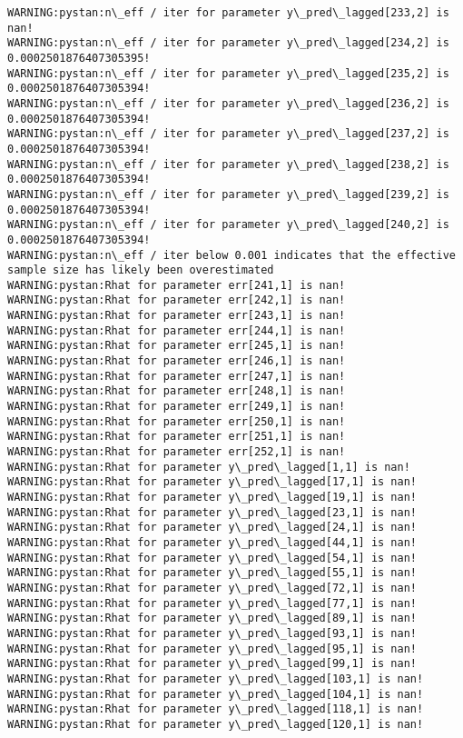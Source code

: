 \documentclass[11pt]{article}
\begin{document}
\begin{Verbatim}[commandchars=\\\{\}]
WARNING:pystan:n\_eff / iter for parameter y\_pred\_lagged[233,2] is nan!
WARNING:pystan:n\_eff / iter for parameter y\_pred\_lagged[234,2] is 0.0002501876407305395!
WARNING:pystan:n\_eff / iter for parameter y\_pred\_lagged[235,2] is 0.0002501876407305394!
WARNING:pystan:n\_eff / iter for parameter y\_pred\_lagged[236,2] is 0.0002501876407305394!
WARNING:pystan:n\_eff / iter for parameter y\_pred\_lagged[237,2] is 0.0002501876407305394!
WARNING:pystan:n\_eff / iter for parameter y\_pred\_lagged[238,2] is 0.0002501876407305394!
WARNING:pystan:n\_eff / iter for parameter y\_pred\_lagged[239,2] is 0.0002501876407305394!
WARNING:pystan:n\_eff / iter for parameter y\_pred\_lagged[240,2] is 0.0002501876407305394!
WARNING:pystan:n\_eff / iter below 0.001 indicates that the effective sample size has likely been overestimated
WARNING:pystan:Rhat for parameter err[241,1] is nan!
WARNING:pystan:Rhat for parameter err[242,1] is nan!
WARNING:pystan:Rhat for parameter err[243,1] is nan!
WARNING:pystan:Rhat for parameter err[244,1] is nan!
WARNING:pystan:Rhat for parameter err[245,1] is nan!
WARNING:pystan:Rhat for parameter err[246,1] is nan!
WARNING:pystan:Rhat for parameter err[247,1] is nan!
WARNING:pystan:Rhat for parameter err[248,1] is nan!
WARNING:pystan:Rhat for parameter err[249,1] is nan!
WARNING:pystan:Rhat for parameter err[250,1] is nan!
WARNING:pystan:Rhat for parameter err[251,1] is nan!
WARNING:pystan:Rhat for parameter err[252,1] is nan!
WARNING:pystan:Rhat for parameter y\_pred\_lagged[1,1] is nan!
WARNING:pystan:Rhat for parameter y\_pred\_lagged[17,1] is nan!
WARNING:pystan:Rhat for parameter y\_pred\_lagged[19,1] is nan!
WARNING:pystan:Rhat for parameter y\_pred\_lagged[23,1] is nan!
WARNING:pystan:Rhat for parameter y\_pred\_lagged[24,1] is nan!
WARNING:pystan:Rhat for parameter y\_pred\_lagged[44,1] is nan!
WARNING:pystan:Rhat for parameter y\_pred\_lagged[54,1] is nan!
WARNING:pystan:Rhat for parameter y\_pred\_lagged[55,1] is nan!
WARNING:pystan:Rhat for parameter y\_pred\_lagged[72,1] is nan!
WARNING:pystan:Rhat for parameter y\_pred\_lagged[77,1] is nan!
WARNING:pystan:Rhat for parameter y\_pred\_lagged[89,1] is nan!
WARNING:pystan:Rhat for parameter y\_pred\_lagged[93,1] is nan!
WARNING:pystan:Rhat for parameter y\_pred\_lagged[95,1] is nan!
WARNING:pystan:Rhat for parameter y\_pred\_lagged[99,1] is nan!
WARNING:pystan:Rhat for parameter y\_pred\_lagged[103,1] is nan!
WARNING:pystan:Rhat for parameter y\_pred\_lagged[104,1] is nan!
WARNING:pystan:Rhat for parameter y\_pred\_lagged[118,1] is nan!
WARNING:pystan:Rhat for parameter y\_pred\_lagged[120,1] is nan!

\end{Verbatim}
\end{document}
